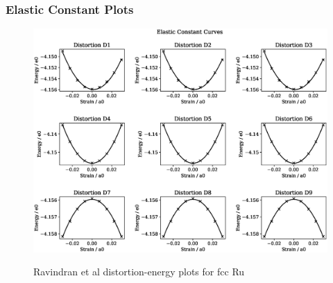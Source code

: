 \clearpage
\subsubsection{Elastic Constant Plots}

\begin{figure}[htb]
\centering
\includegraphics[width=.90\linewidth]{chapters/potentials_fe_pd_ru/feru_potential/ec_rfkj/elastic_strains_bp_0.eps}  
\label{fig:feru-rufcc-rose}
\caption{Ravindran et al\cite{dftrfkj} distortion-energy plots for \acrshort{fcc} Ru}
\end{figure}

